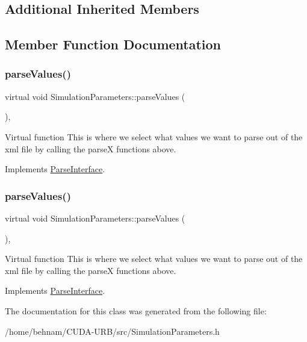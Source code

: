 \subsection*{Additional Inherited Members}


\subsection{Member Function Documentation}
\mbox{\label{classSimulationParameters_a306c6d373794f5186beec9026f56845c}} 
\subsubsection{\texorpdfstring{parse\+Values()}{parseValues()}\hspace{0.1cm}{\footnotesize\ttfamily [1/2]}}
{\footnotesize\ttfamily virtual void Simulation\+Parameters\+::parse\+Values (\begin{DoxyParamCaption}{ }\end{DoxyParamCaption})\hspace{0.3cm}{\ttfamily [inline]}, {\ttfamily [virtual]}}

Virtual function This is where we select what values we want to parse out of the xml file by calling the parseX functions above. 

Implements \hyperlink{classParseInterface_afca32108192ba0997c9e5a78189b0cbc}{Parse\+Interface}.

\mbox{\label{classSimulationParameters_a306c6d373794f5186beec9026f56845c}} 
\subsubsection{\texorpdfstring{parse\+Values()}{parseValues()}\hspace{0.1cm}{\footnotesize\ttfamily [2/2]}}
{\footnotesize\ttfamily virtual void Simulation\+Parameters\+::parse\+Values (\begin{DoxyParamCaption}{ }\end{DoxyParamCaption})\hspace{0.3cm}{\ttfamily [inline]}, {\ttfamily [virtual]}}

Virtual function This is where we select what values we want to parse out of the xml file by calling the parseX functions above. 

Implements \hyperlink{classParseInterface_afca32108192ba0997c9e5a78189b0cbc}{Parse\+Interface}.



The documentation for this class was generated from the following file\+:\begin{DoxyCompactItemize}
\item 
/home/behnam/\+C\+U\+D\+A-\/\+U\+R\+B/src/Simulation\+Parameters.\+h\end{DoxyCompactItemize}

